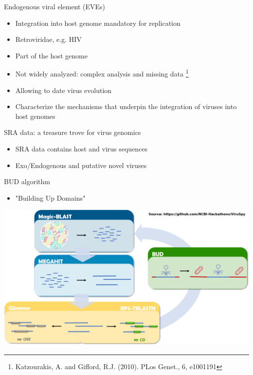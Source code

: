\documentclass{beamer}
\begin{document}
  \begin{frame}{Endogenous viral element (EVEs)}
      \center
        
      \begin{itemize}
        \item Integration into host genome mandatory for replication
        \item Retroviridae, e.g. HIV
        \item Part of the host genome
        \item Not widely analyzed: complex analysis and missing data
              \footnote{Katzourakis, A. and Gifford, R.J. (2010). PLos Genet., 6, e1001191}
        \item Allowing to date virus evolution
        \item Characterize the mechanisms that underpin the integration of
              viruses into host genomes
      \end{itemize}
  \end{frame}

  \begin{frame}{SRA data: a treasure trove for virus genomics}
    \begin{itemize}
      \item SRA data contains host and virus sequences
      \item Exo/Endogenous and putative novel viruses
    \end{itemize}
    
  \end{frame}


  \begin{frame}{BUD algorithm}
    \begin{itemize}
      \item "Building Up Domains"
    \end{itemize}
    \center
    \includegraphics[width=\linewidth]{figs/bud_algo.jpg}
  \end{frame}
\end{document}
